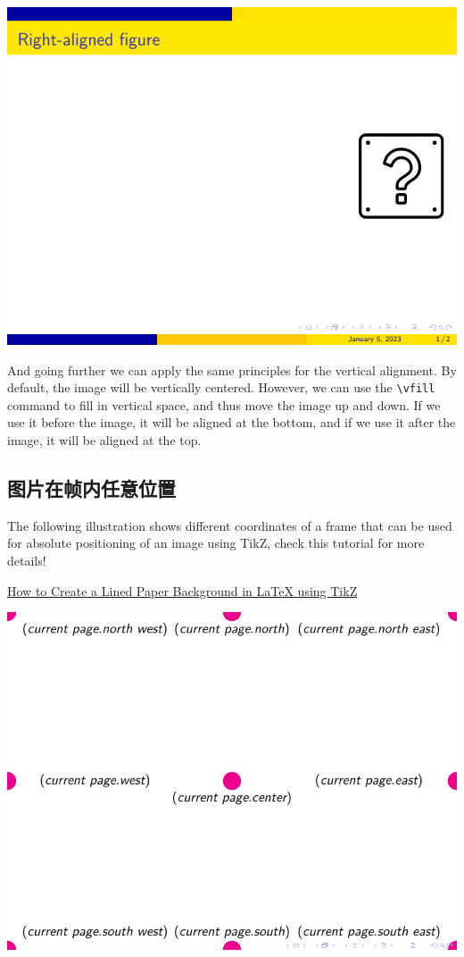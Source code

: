 \begin{column}{0.5\textwidth}
\includegraphics[page=2]{examples/beamer/figure-alignment-inside-frame.pdf}

And going further we can apply the same principles for the vertical alignment. By default, the image will be vertically centered. However, we can use the \verb|\vfill| command to fill in vertical space, and thus move the image up and down. If we use it before the image, it will be aligned at the bottom, and if we use it after the image, it will be aligned at the top.

\subsection{图片在帧内任意位置}

The following illustration shows different coordinates of a frame that can be used for absolute positioning of an image using TikZ, check this tutorial for more details!

\href{https://latexdraw.com/how-to-create-a-lined-paper-background-in-latex-using-tikz/}{How to Create a Lined Paper Background in LaTeX using TikZ}

\includegraphics[page=1]{examples/beamer/beamer-frame-position.pdf}


\end{column}

